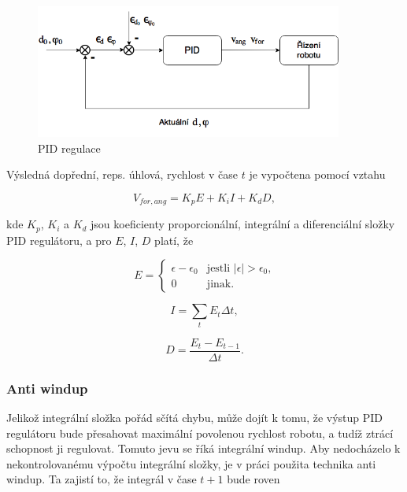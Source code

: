 \documentclass[twoside]{ctuthesis}
\theoremstyle{plain}
\theoremstyle{definition}
\theoremstyle{note}
\begin{document}
\begin{figure}[H]
	\caption{PID regulace}

	\label{pid}
	\includegraphics[width=0.9\textwidth, height = 0.4\textwidth]{images/3/PID.png}
\end{figure}


Výsledná dopřední, reps. úhlová, rychlost v čase $t$ je vypočtena pomocí vztahu 

\begin{equation}
V_{for, ang} = K_pE + K_iI + K_dD,
\end{equation}

kde $K_p$, $K_i$ a $K_d$ jsou koeficienty proporcionální, integrální a diferenciální složky PID regulátoru, a pro $E$, $I$, $D$ platí, že

\begin{equation}
E = \left\{
\begin{array}{ll}
\epsilon - \epsilon_0&\textrm{jestli $\left|\epsilon\right| > \epsilon_0$,}\\
0&\textrm{jinak.}
\end{array}
\right.
\end{equation}

\begin{equation}
I = \sum_t E_t \Delta t, 
\end{equation}

\begin{equation}
D = \frac{E_t - E_{t-1}}{\Delta t}.
\end{equation}

\subsubsection{Anti windup}

Jelikož integrální složka pořád sčítá chybu, může dojít k tomu, že výstup PID regulátoru bude přesahovat maximální povolenou rychlost robotu, a tudíž ztrácí schopnost ji regulovat. Tomuto jevu se říká integrální windup. Aby nedocházelo k nekontrolovanému výpočtu integrální složky, je v práci použita technika anti windup. Ta zajistí to, že integrál v čase $t+1$ bude roven
\end{document}
